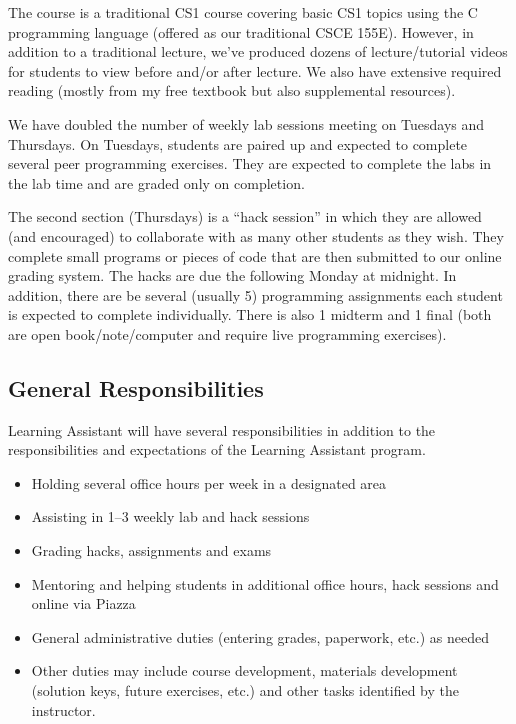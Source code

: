 \documentclass[12pt]{scrartcl}
\begin{document}
The course is a traditional CS1 course covering basic CS1 topics 
using the C programming language (offered as our traditional CSCE 155E).  
However, in addition to a traditional lecture, we've produced dozens of 
lecture/tutorial videos for students to view before and/or after lecture.  
We also have extensive required reading (mostly from my free textbook but 
also supplemental resources).  

We have doubled the number of weekly lab sessions meeting on Tuesdays and
Thursdays.  On Tuesdays, students are paired up and expected to complete 
several peer programming exercises.  They are 
expected to complete the labs in the lab time and are graded only on 
completion.

The second section (Thursdays) is a ``hack session'' in which they are 
allowed (and encouraged) to collaborate with as many other students as 
they wish.  They complete small programs or pieces of code that are 
then submitted to our online grading system.  The hacks are due the 
following Monday at midnight.  In addition, there are
be several (usually 5) programming assignments each student is expected
to complete individually.  There is also 1 midterm and 1 final (both 
are open book/note/computer and require live programming exercises). 

\subsection*{General Responsibilities}

Learning Assistant will have several responsibilities in addition to the
responsibilities and expectations of the Learning Assistant program.

\begin{itemize}
  \item Holding several office hours per week in a designated area
  \item Assisting in 1--3 weekly lab and hack sessions
  \item Grading hacks, assignments and exams
  \item Mentoring and helping students in additional office hours, hack sessions
  and online via Piazza
  \item General administrative duties (entering grades, paperwork, etc.) as needed
  \item Other duties may include course development, materials development 
  (solution keys, future exercises, etc.) and other tasks identified by the instructor.
\end{itemize}
\end{document}
